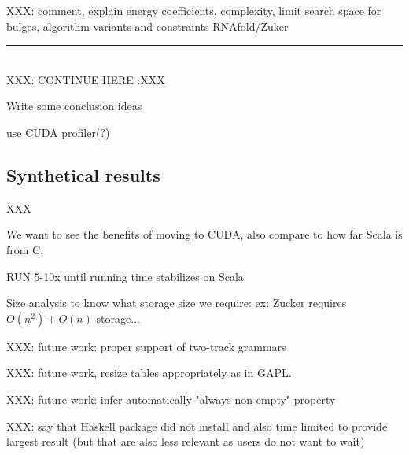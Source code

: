{\color{red} XXX: comment, explain energy coefficients, complexity, limit search space for bulges, algorithm variants and constraints RNAfold/Zuker}

{\center\color{red} \noindent\rule{16cm}{0.4pt} \\ XXX: CONTINUE HERE :XXX \\}

{\color{red}\ol
\item Write some conclusion ideas
\item use CUDA profiler(?)
\ole}

\subsection{Synthetical results}
XXX

{\color{red} We want to see the benefits of moving to CUDA, also compare to how far Scala is from C.}

RUN 5-10x until running time stabilizes on Scala

 {\color{red} Size analysis to know what storage size we require: ex: Zucker requires $O(n^2)+O(n)$ storage...}

XXX: future work: proper support of two-track grammars

XXX: future work, resize tables appropriately as in GAPL.

XXX: future work: infer automatically "always non-empty" property

{\color{red} XXX: say that Haskell package did not install and also time limited to provide largest result (but that are also less relevant as users do not want to wait)}

%
